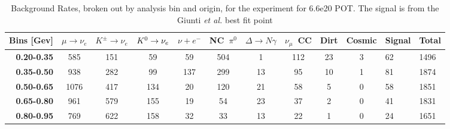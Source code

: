 \begin{table}
\centering

\caption[\icarus Electron Neutrino Event Rate Expectations]{Background Rates, broken out by analysis bin and origin, for the \icarus experiment for 6.6e20 POT. The signal is from the Giunti {\em et al.} best fit point}
\begin{tabular}{r|cccccccccll}
\multicolumn{1}{l|}{Bins [Gev]} & \multicolumn{1}{l}{$\mu\rightarrow\nu_e$} & \multicolumn{1}{l}{$K^{\pm}\rightarrow \nu_e$} & \multicolumn{1}{l}{$K^0 \rightarrow \nu_{e}$} & \multicolumn{1}{l}{$\nu + e^-$} & \multicolumn{1}{l}{NC~$\pi^0$} & \multicolumn{1}{l}{$\Delta \rightarrow N\gamma$} & \multicolumn{1}{l}{$\nu_{\mu}$~CC} & \multicolumn{1}{l}{Dirt} & \multicolumn{1}{l}{Cosmic} & Signal & Total \\ \hline
\textbf{0.20-0.35}        & 585                         & 151                         & 59                          & 59                       & 504                        & 1                          & 112                        & 23                       & 3                          & 62     & 1496  \\
\textbf{0.35-0.50}        & 938                         & 282                         & 99                          & 137                      & 299                        & 13                         & 95                         & 10                       & 1                          & 81     & 1874  \\
\textbf{0.50-0.65}        & 1076                        & 417                         & 134                         & 20                       & 120                        & 21                         & 58                         & 5                        & 0                          & 58     & 1851  \\
\textbf{0.65-0.80}        & 961                         & 579                         & 155                         & 19                       & 54                         & 23                         & 37                         & 2                        & 0                          & 41     & 1831  \\
\textbf{0.80-0.95}        & 769                         & 622                         & 158                         & 32                       & 33                         & 13                         & 22                         & 1                        & 0                          & 24     & 1651  \\

\end{tabular}
\end{table}
